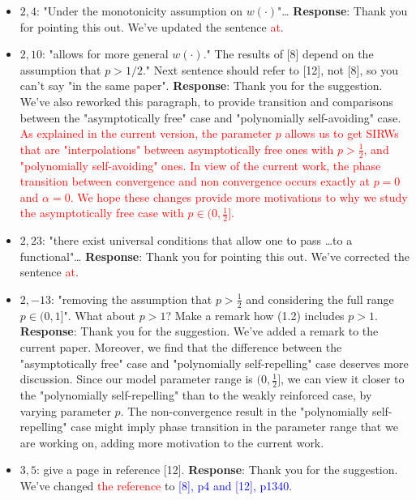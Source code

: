 \documentclass[11pt,a4paper]{article}
\numberwithin{equation}{section}
\newcommand{\corr}[2]{We've changed {\textcolor{red}{#1}} to {\textcolor{blue}{#2}}.}
\def\TBF#1{\textcolor{red}{#1}} %
\begin{document}
\begin{itemize}
		\item 
		$2,4$: "Under the monotonicity assumption on $w(\cdot)$"\dots
		\subitem \textbf{Response}: Thank you for pointing this out.  We've updated the sentence \TBF{at}. 
		
		\item 
		$2,10$: "allows for more general $w(\cdot)$." The results of [8] depend on the assumption that $p > 1/2.$" Next sentence should refer to [12], not [8], so you can't say "in the same paper".
		\subitem \textbf{Response}: Thank you for the suggestion. We've also reworked this paragraph, to provide transition and comparisons between the "asymptotically free" case and "polynomially self-avoiding" case. \TBF{As explained in the current version, the parameter $p$ allows us to get SIRWs that are "interpolations" between asymptotically free ones with $p>\frac{1}{2}$, and "polynomially self-avoiding" ones. In view of the current work, the phase transition between convergence and non convergence occurs exactly at $p=0$ and $\alpha =0$. We hope these changes provide more motivations to why we study the asymptotically free case with $p\in(0,\frac{1}{2}]$. }
		
		
		\item
		$2,23$: "there exist universal conditions that allow one to pass \dots to a functional"\dots
		\subitem \textbf{Response}: Thank you for pointing this out. We've corrected the sentence \TBF{at}. 
		
		\item
		$2,-13$: "removing the assumption that $p > \frac{1}{2}$ and considering the full range $p\in (0,1]$". What about $p > 1$? Make a remark how (1.2) includes $p > 1$.
		\subitem \textbf{Response}: Thank you for the suggestion. We've added a remark to the current paper. Moreover, we find that the difference between the "asymptotically free" case and "polynomially self-repelling" case deserves more discussion. Since our model parameter range is $(0,\frac{1}{2}]$, we can view it closer to the "polynomially self-repelling" than to the weakly reinforced case, by varying parameter $p$. The non-convergence result in the "polynomially self-repelling" case might imply phase transition in the parameter range that we are working on, adding more motivation to the current work.
		
		
		\item
		$3,5$: give a page in reference [12].
		\subitem \textbf{Response}: Thank you for the suggestion. \corr{the reference }{[8], p4 and [12],
			p1340}
		

\end{itemize}
\end{document}
